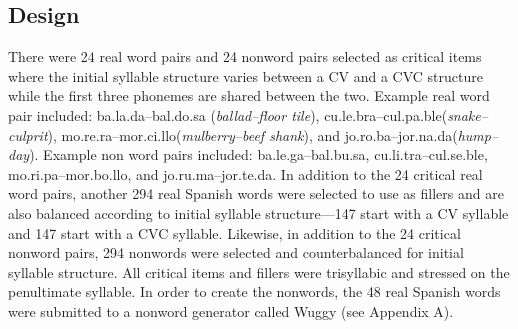 
\subsection{Design}

There were 24 real word pairs and 24 nonword pairs selected as critical items where the initial syllable structure varies between a CV and a CVC structure while the first three phonemes are shared between the two. Example real word pair included: ba.la.da–bal.do.sa (\emph{ballad–floor tile}), cu.le.bra–cul.pa.ble(\emph{snake–culprit}), mo.re.ra–mor.ci.llo(\emph{mulberry–beef shank}), and jo.ro.ba–jor.na.da(\emph{hump–day}). Example non word pairs included: ba.le.ga–bal.bu.sa, cu.li.tra–cul.se.ble, mo.ri.pa–mor.bo.llo, and jo.ru.ma–jor.te.da. In addition to the 24 critical real word pairs, another 294 real Spanish words were selected to use as fillers and are also balanced according to initial syllable structure—147 start with a CV syllable and 147 start with a CVC syllable. Likewise, in addition to the 24 critical nonword pairs, 294 nonwords were selected and counterbalanced for initial syllable structure. All critical items and fillers were trisyllabic and stressed on the penultimate syllable. In order to create the nonwords, the 48 real Spanish words were submitted to a nonword generator called Wuggy (see Appendix A). %

